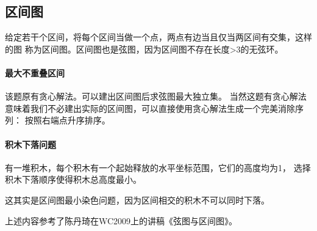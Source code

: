 \subsection{区间图}
给定若干个区间，将每个区间当做一个点，两点有边当且仅当两区间有交集，这样的图
称为区间图。区间图也是弦图，因为区间图不存在长度>3的无弦环。

\paragraph{最大不重叠区间} 该题原有贪心解法。可以建出区间图后求弦图最大独立集。
当然这题有贪心解法意味着我们不必建出实际的区间图，可以直接使用贪心解法生成一个完美消除序列：
按照右端点升序排序。

\paragraph{积木下落问题}
有一堆积木，每个积木有一个起始释放的水平坐标范围，它们的高度均为1，
选择积木下落顺序使得积木总高度最小。

这其实是区间图最小染色问题，因为区间相交的积木不可以同时下落。

上述内容参考了陈丹琦在WC2009上的讲稿《弦图与区间图》\cite{chord}。
